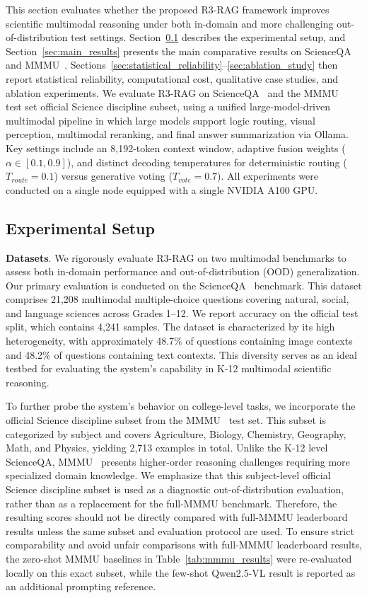 \documentclass[a4paper, fleqn]{cas-dc}
\begin{document}
This section evaluates whether the proposed R3-RAG framework improves scientific multimodal reasoning under both in-domain and more challenging out-of-distribution test settings. Section~\ref{sec:experimental_setup} describes the experimental setup, and Section~\ref{sec:main_results} presents the main comparative results on ScienceQA~\cite{Lu2022} and MMMU~\cite{Yue2024MMMU}. Sections~\ref{sec:statistical_reliability}--\ref{sec:ablation_study} then report statistical reliability, computational cost, qualitative case studies, and ablation experiments.
We evaluate R3-RAG on ScienceQA~\cite{Lu2022} and the MMMU~\cite{Yue2024MMMU} test set official Science discipline subset, using a unified large-model-driven multimodal pipeline in which large models support logic routing, visual perception, multimodal reranking, and final answer summarization via Ollama. Key settings include an 8,192-token context window, adaptive fusion weights ($\alpha \in [0.1, 0.9]$), and distinct decoding temperatures for deterministic routing ($T_{route} = 0.1$) versus generative voting ($T_{vote} = 0.7$). All experiments were conducted on a single node equipped with a single NVIDIA A100 GPU.
\subsection{Experimental Setup}\label{sec:experimental_setup}
\textbf{Datasets}. We rigorously evaluate R3-RAG on two multimodal benchmarks to assess both in-domain performance and out-of-distribution (OOD) generalization.
Our primary evaluation is conducted on the ScienceQA~\cite{Lu2022} benchmark.
This dataset comprises 21,208 multimodal multiple-choice questions covering natural, social, and language sciences across Grades 1--12.
We report accuracy on the official test split, which contains 4,241 samples.
The dataset is characterized by its high heterogeneity, with approximately 48.7\% of questions containing image contexts and 48.2\% of questions containing text contexts.
This diversity serves as an ideal testbed for evaluating the system's capability in K-12 multimodal scientific reasoning.

To further probe the system's behavior on college-level tasks, we incorporate the official Science discipline subset from the MMMU~\cite{Yue2024MMMU} test set.
This subset is categorized by subject and covers Agriculture, Biology, Chemistry, Geography, Math, and Physics, yielding 2,713 examples in total.
Unlike the K-12 level ScienceQA, MMMU~\cite{Yue2024MMMU} presents higher-order reasoning challenges requiring more specialized domain knowledge.
We emphasize that this subject-level official Science discipline subset is used as a diagnostic out-of-distribution evaluation, rather than as a replacement for the full-MMMU benchmark. Therefore, the resulting scores should not be directly compared with full-MMMU leaderboard results unless the same subset and evaluation protocol are used. To ensure strict comparability and avoid unfair comparisons with full-MMMU leaderboard results, the zero-shot MMMU baselines in Table~\ref{tab:mmmu_results} were re-evaluated locally on this exact subset, while the few-shot Qwen2.5-VL result is reported as an additional prompting reference.
\end{document}
